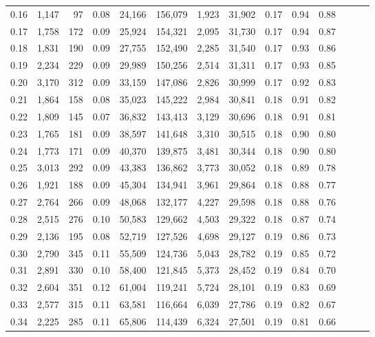 \begin{tabular}{rrrrrrrrrrrrrr}
0.16 &  1,147 &   97 &  0.08 &   24,166 &  156,079 &   1,923 &  31,902 &  0.17 &  0.94 &      0.88 \\
0.17 &  1,758 &  172 &  0.09 &   25,924 &  154,321 &   2,095 &  31,730 &  0.17 &  0.94 &      0.87 \\
0.18 &  1,831 &  190 &  0.09 &   27,755 &  152,490 &   2,285 &  31,540 &  0.17 &  0.93 &      0.86 \\
0.19 &  2,234 &  229 &  0.09 &   29,989 &  150,256 &   2,514 &  31,311 &  0.17 &  0.93 &      0.85 \\
0.20 &  3,170 &  312 &  0.09 &   33,159 &  147,086 &   2,826 &  30,999 &  0.17 &  0.92 &      0.83 \\
0.21 &  1,864 &  158 &  0.08 &   35,023 &  145,222 &   2,984 &  30,841 &  0.18 &  0.91 &      0.82 \\
0.22 &  1,809 &  145 &  0.07 &   36,832 &  143,413 &   3,129 &  30,696 &  0.18 &  0.91 &      0.81 \\
0.23 &  1,765 &  181 &  0.09 &   38,597 &  141,648 &   3,310 &  30,515 &  0.18 &  0.90 &      0.80 \\
0.24 &  1,773 &  171 &  0.09 &   40,370 &  139,875 &   3,481 &  30,344 &  0.18 &  0.90 &      0.80 \\
0.25 &  3,013 &  292 &  0.09 &   43,383 &  136,862 &   3,773 &  30,052 &  0.18 &  0.89 &      0.78 \\
0.26 &  1,921 &  188 &  0.09 &   45,304 &  134,941 &   3,961 &  29,864 &  0.18 &  0.88 &      0.77 \\
0.27 &  2,764 &  266 &  0.09 &   48,068 &  132,177 &   4,227 &  29,598 &  0.18 &  0.88 &      0.76 \\
0.28 &  2,515 &  276 &  0.10 &   50,583 &  129,662 &   4,503 &  29,322 &  0.18 &  0.87 &      0.74 \\
0.29 &  2,136 &  195 &  0.08 &   52,719 &  127,526 &   4,698 &  29,127 &  0.19 &  0.86 &      0.73 \\
0.30 &  2,790 &  345 &  0.11 &   55,509 &  124,736 &   5,043 &  28,782 &  0.19 &  0.85 &      0.72 \\
0.31 &  2,891 &  330 &  0.10 &   58,400 &  121,845 &   5,373 &  28,452 &  0.19 &  0.84 &      0.70 \\
0.32 &  2,604 &  351 &  0.12 &   61,004 &  119,241 &   5,724 &  28,101 &  0.19 &  0.83 &      0.69 \\
0.33 &  2,577 &  315 &  0.11 &   63,581 &  116,664 &   6,039 &  27,786 &  0.19 &  0.82 &      0.67 \\
0.34 &  2,225 &  285 &  0.11 &   65,806 &  114,439 &   6,324 &  27,501 &  0.19 &  0.81 &      0.66 \\

\end{tabular}
